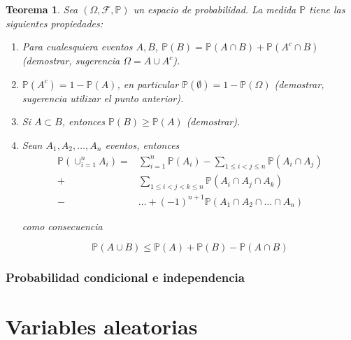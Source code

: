 \documentclass[11pt]{report}
\theoremstyle{break}
\newtheorem{teorema}{Teorema}[chapter]
\theoremstyle{break}
\begin{document}
\begin{teorema}
\label{teorema:propiedades de las medidas de probabilidad}
Sea $\left( \Omega, \mathcal{F}, \mathbb{P} \right)$ un espacio de probabilidad. La medida $\mathbb{P}$ tiene las siguientes propiedades:

\begin{enumerate}
\item Para cualesquiera eventos $A,B$, $\mathbb{P}(B) = \mathbb{P}(A \cap B) + \mathbb{P}(A^c \cap B)$ (demostrar, sugerencia $\Omega = A \cup A^c$).

\item $\mathbb{P}(A^c) = 1 - \mathbb{P}(A)$, en particular $\mathbb{P}(\emptyset) = 1 - \mathbb{P}(\Omega)$ (demostrar, sugerencia utilizar el punto anterior).

\item Si $A \subset B$, entonces $\mathbb{P}(B) \geq \mathbb{P}(A)$ (demostrar).

\item Sean $A_1, A_2, \ldots, A_n$  eventos, entonces 
\begin{align*}
\mathbb{P}(\cup_{i=1}^{n}A_i)  = & \sum_{i=1}^{n}\mathbb{P}(A_i) - \sum_{1 \leq i < j \leq n} \mathbb{P}(A_i \cap A_j) \\
+ & \sum_{1 \leq i < j < k \leq n} \mathbb{P}(A_i \cap A_j \cap A_k) \\
- & \ldots + (-1)^{n + 1}\mathbb{P}(A_1 \cap A_2 \cap \ldots \cap A_n)
\end{align*}

como consecuencia

$$
\mathbb{P}(A \cup B) \leq \mathbb{P}(A) + \mathbb{P}(B) - \mathbb{P}(A \cap B)
$$

\end{enumerate}

\end{teorema}

\subsection{Probabilidad condicional e independencia}
\label{seccion:probabilidad condicional e independencia}

\chapter{Variables aleatorias}
\label{capitulo:variables aleatorias}
\end{document}
